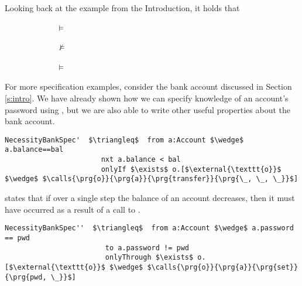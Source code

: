 Looking back at the example from the Introduction,   it holds that
\\
\strut $\hspace{1in}$  $\models$ 
 \\
\strut $\hspace{1in}$  $\not\models$ 
 \\
\strut $\hspace{1in}$  $\models$ 
 

 
For more specification examples, consider the
bank account discussed in Section \ref{s:intro}. We have already shown
how we can specify knowledge of an account's password using ,
but we are also able to write other useful properties about the bank account. 
 
\begin{lstlisting}[language = Chainmail, mathescape=true, frame=lines]
NecessityBankSpec'  $\triangleq$  from a:Account $\wedge$ a.balance==bal
                       nxt a.balance < bal
                       onlyIf $\exists$ o.[$\external{\texttt{o}}$ $\wedge$ $\calls{\prg{o}}{\prg{a}}{\prg{transfer}}{\prg{\_, \_, \_}}$]
\end{lstlisting}
 
 states that if over a single step the balance of an account decreases, then it must have occurred as 
a result of a call to .
 
\begin{lstlisting}[language = Chainmail, mathescape=true, frame=lines]
NecessityBankSpec''  $\triangleq$  from a:Account $\wedge$ a.password == pwd
                        to a.password != pwd
                        onlyThrough $\exists$ o.[$\external{\texttt{o}}$ $\wedge$ $\calls{\prg{o}}{\prg{a}}{\prg{set}}{\prg{pwd, \_}}$]
\end{lstlisting}
 

